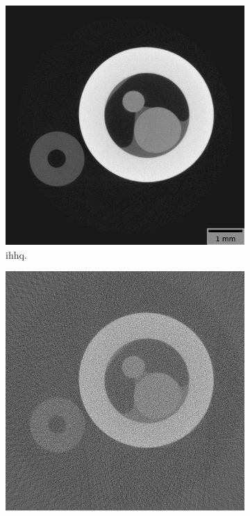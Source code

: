 \begin{figure}
    \begin{subfigure}[t]{.31\textwidth}
      \centering
      \includegraphics[width=\linewidth]{figures/kimrobertgt.png}
      \caption{\gls{ihhq}. }
    \end{subfigure}
    \hfill
    \begin{subfigure}[t]{.31\textwidth}
      \centering
      \includegraphics[width=\linewidth]{figures/kimrobertFDK.png}

\end{subfigure}
\end{figure}
